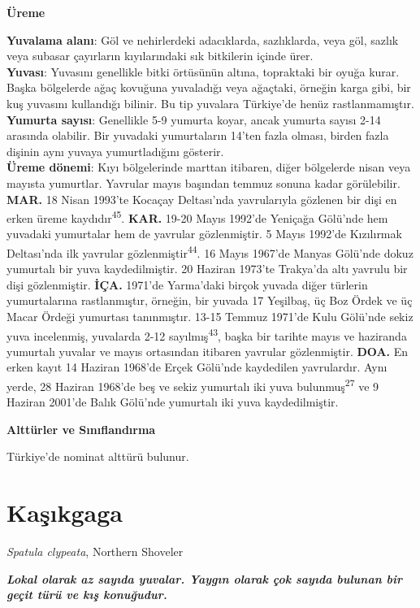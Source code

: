 \documentclass[
  letterpaper,
  DIV=11,
  numbers=noendperiod]{scrreprt}
\begin{document}
\textbf{Üreme}

\textbf{Yuvalama alanı}: Göl ve nehirlerdeki adacıklarda, sazlıklarda,
veya göl, sazlık veya subasar çayırların kıyılarındaki sık bitkilerin
içinde ürer.\\
\textbf{Yuvası}: Yuvasını genellikle bitki örtüsünün altına, topraktaki
bir oyuğa kurar. Başka bölgelerde ağaç kovuğuna yuvaladığı veya
ağaçtaki, örneğin karga gibi, bir kuş yuvasını kullandığı bilinir. Bu
tip yuvalara Türkiye'de henüz rastlanmamıştır.\\
\textbf{Yumurta sayısı}: Genellikle 5-9 yumurta koyar, ancak yumurta
sayısı 2-14 arasında olabilir. Bir yuvadaki yumurtaların 14'ten fazla
olması, birden fazla dişinin aynı yuvaya yumurtladığını gösterir.\\
\textbf{Üreme dönemi}: Kıyı bölgelerinde marttan itibaren, diğer
bölgelerde nisan veya mayısta yumurtlar. Yavrular mayıs başından temmuz
sonuna kadar görülebilir. \textbf{MAR.} 18 Nisan 1993'te Kocaçay
Deltası'nda yavrularıyla gözlenen bir dişi en erken üreme
kaydıdır\textsuperscript{45}. \textbf{KAR.} 19-20 Mayıs 1992'de Yeniçağa
Gölü'nde hem yuvadaki yumurtalar hem de yavrular gözlenmiştir. 5 Mayıs
1992'de Kızılırmak Deltası'nda ilk yavrular
gözlenmiştir\textsuperscript{44}. 16 Mayıs 1967'de Manyas Gölü'nde dokuz
yumurtalı bir yuva kaydedilmiştir. 20 Haziran 1973'te Trakya'da altı
yavrulu bir dişi gözlenmiştir. \textbf{İÇA.} 1971'de Yarma'daki birçok
yuvada diğer türlerin yumurtalarına rastlanmıştır, örneğin, bir yuvada
17 Yeşilbaş, üç Boz Ördek ve üç Macar Ördeği yumurtası tanınmıştır.
13-15 Temmuz 1971'de Kulu Gölü'nde sekiz yuva incelenmiş, yuvalarda 2-12
sayılmış\textsuperscript{43}, başka bir tarihte mayıs ve haziranda
yumurtalı yuvalar ve mayıs ortasından itibaren yavrular gözlenmiştir.
\textbf{DOA.} En erken kayıt 14 Haziran 1968'de Erçek Gölü'nde
kaydedilen yavrulardır. Aynı yerde, 28 Haziran 1968'de beş ve sekiz
yumurtalı iki yuva bulunmuş\textsuperscript{27} ve 9 Haziran 2001'de
Balık Gölü'nde yumurtalı iki yuva kaydedilmiştir.

\textbf{Alttürler ve Sınıflandırma}

Türkiye'de nominat alttürü bulunur.

\section{Kaşıkgaga}\label{kaux15fux131kgaga}

\emph{Spatula clypeata}, Northern Shoveler

\textbf{\emph{Lokal olarak az sayıda yuvalar. Yaygın olarak çok sayıda
bulunan bir geçit türü ve kış konuğudur.}}
\end{document}
